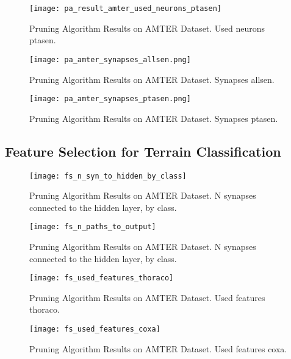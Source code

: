 \begin{figure}[H]
  \centering
  \texttt{[image: pa\_result\_amter\_used\_neurons\_ptasen]}
  \caption{Pruning Algorithm Results on AMTER Dataset. Used neurons ptasen.}
  \label{fig:pa_amter_used_neurons_ptasen}
\end{figure}

\begin{figure}[H]
  \centering
  \texttt{[image: pa\_amter\_synapses\_allsen.png]}
  \caption{Pruning Algorithm Results on AMTER Dataset. Synapses allsen.}
  \label{fig:pa_amter_synapses_allsen}
\end{figure}

\begin{figure}[H]
  \centering
  \texttt{[image: pa\_amter\_synapses\_ptasen.png]}
  \caption{Pruning Algorithm Results on AMTER Dataset. Synapses ptasen.}
  \label{fig:pa_amter_synapses_ptasen}
\end{figure}

\subsection{Feature Selection for Terrain Classification} \label{ssec:pa_amter_feature_selection}

\begin{figure}[H]
  \centering
  \texttt{[image: fs\_n\_syn\_to\_hidden\_by\_class]}
  \caption{Pruning Algorithm Results on AMTER Dataset. N synapses connected to the hidden layer, by class.}
  \label{fig:pa_amter_n_syn_to_hidden_by_class}
\end{figure}

\begin{figure}[H]
  \centering
  \texttt{[image: fs\_n\_paths\_to\_output]}
  \caption{Pruning Algorithm Results on AMTER Dataset. N synapses connected to the hidden layer, by class.}
  \label{fig:pa_amter_n_syn_to_hidden_by_class}
\end{figure}

\begin{figure}[H]
  \centering
  \texttt{[image: fs\_used\_features\_thoraco]}
  \caption{Pruning Algorithm Results on AMTER Dataset. Used features thoraco.}
  \label{fig:pa_amter_used_features_thoraco}
\end{figure}

\begin{figure}[H]
  \centering
  \texttt{[image: fs\_used\_features\_coxa]}
  \caption{Pruning Algorithm Results on AMTER Dataset. Used features coxa.}
  \label{fig:pa_amter_used_features_coxa}
\end{figure}

